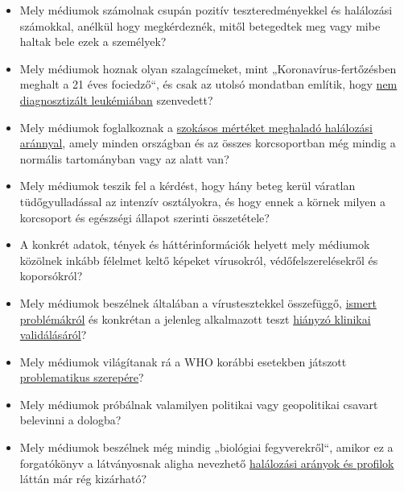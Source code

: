 \begin{itemize}
\tightlist
\item
  Mely médiumok számolnak csupán pozitív teszteredményekkel és
  halálozási számokkal, anélkül hogy megkérdeznék, mitől betegedtek meg
  vagy mibe haltak bele ezek a személyek?
\item
  Mely médiumok hoznak olyan szalagcímeket, mint
  „Koronavírus-fertőzésben meghalt a 21 éves fociedző``, és csak az
  utolsó mondatban említik, hogy
  \href{https://www.msn.com/de-ch/news/other/spanischer-nachwuchs-trainer-stirbt-an-corona/ar-BB11gT64}{nem
  diagnosztizált leukémiában} szenvedett?
\item
  Mely médiumok foglalkoznak a
  \href{https://www.euromomo.eu/index.html}{szokásos mértéket meghaladó
  halálozási aránnyal}, amely minden országban és az összes
  korcsoportban még mindig a normális tartományban vagy az alatt van?
\item
  Mely médiumok teszik fel a kérdést, hogy hány beteg kerül váratlan
  tüdőgyulladással az intenzív osztályokra, és hogy ennek a körnek
  milyen a korcsoport és egészségi állapot szerinti összetétele?
\item
  A konkrét adatok, tények és háttérinformációk helyett mely médiumok
  közölnek inkább félelmet keltő képeket vírusokról,
  védőfelszerelésekről és koporsókról?
\item
  Mely médiumok beszélnek általában a vírustesztekkel összefüggő,
  \href{https://www.ncbi.nlm.nih.gov/pmc/articles/PMC2095096/}{ismert
  problémákról} és konkrétan a jelenleg alkalmazott teszt
  \href{https://www.creative-diagnostics.com/sars-cov-2-coronavirus-multiplex-rt-qpcr-kit-277854-457.htm}{hiányzó
  klinikai validálásáról}?
\item
  Mely médiumok világítanak rá a WHO korábbi esetekben játszott
  \href{https://www.forbes.com/2010/02/05/world-health-organization-swine-flu-pandemic-opinions-contributors-michael-fumento.html\#208eef4048e8}{problematikus
  szerepére}?
\item
  Mely médiumok próbálnak valamilyen politikai vagy geopolitikai csavart
  belevinni a dologba?
\item
  Mely médiumok beszélnek még mindig „biológiai fegyverekről``, amikor
  ez a forgatókönyv a látványosnak aligha nevezhető
  \href{https://www.statnews.com/2020/03/17/a-fiasco-in-the-making-as-the-coronavirus-pandemic-takes-hold-we-are-making-decisions-without-reliable-data/}{halálozási
  arányok és profilok} láttán már rég kizárható?
\end{itemize}

